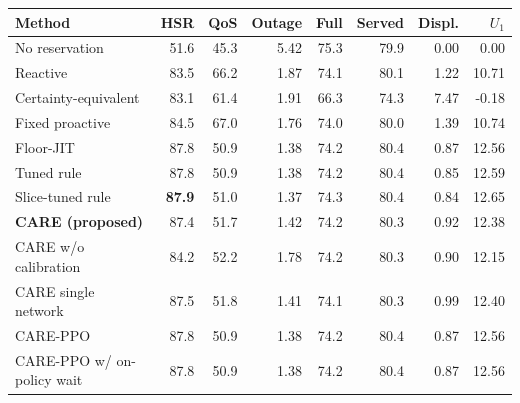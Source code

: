 \begin{tabular}{lrrrrrrr}
\toprule
Method & HSR & QoS & Outage & Full & Served & Displ. & $U_{1}$\\
\midrule
No reservation & 51.6 & 45.3 & 5.42 & 75.3 & 79.9 & 0.00 & 0.00\\
Reactive & 83.5 & 66.2 & 1.87 & 74.1 & 80.1 & 1.22 & 10.71\\
Certainty-equivalent & 83.1 & 61.4 & 1.91 & 66.3 & 74.3 & 7.47 & -0.18\\
Fixed proactive & 84.5 & 67.0 & 1.76 & 74.0 & 80.0 & 1.39 & 10.74\\
Floor-JIT & 87.8 & 50.9 & 1.38 & 74.2 & 80.4 & 0.87 & 12.56\\
Tuned rule & 87.8 & 50.9 & 1.38 & 74.2 & 80.4 & 0.85 & 12.59\\
Slice-tuned rule & \textbf{87.9} & 51.0 & 1.37 & 74.3 & 80.4 & 0.84 & 12.65\\
\textbf{CARE (proposed)} & 87.4 & 51.7 & 1.42 & 74.2 & 80.3 & 0.92 & 12.38\\
\midrule
CARE w/o calibration & 84.2 & 52.2 & 1.78 & 74.2 & 80.3 & 0.90 & 12.15\\
CARE single network & 87.5 & 51.8 & 1.41 & 74.1 & 80.3 & 0.99 & 12.40\\
CARE-PPO & 87.8 & 50.9 & 1.38 & 74.2 & 80.4 & 0.87 & 12.56\\
CARE-PPO w/ on-policy wait & 87.8 & 50.9 & 1.38 & 74.2 & 80.4 & 0.87 & 12.56\\
\bottomrule
\end{tabular}
